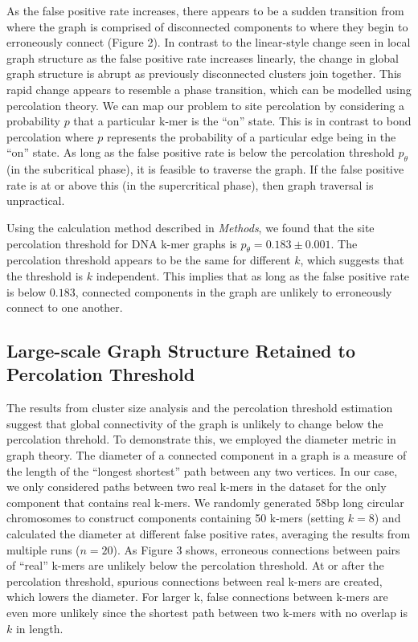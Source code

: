 \documentclass[12pt]{article} \usepackage{simplemargins}
\begin{document}
As the false positive rate increases, there appears to be a sudden
transition from where the graph is comprised of disconnected 
components to where they begin to erroneously connect (Figure 2). 
In contrast to the linear-style change seen 
in local graph structure as the false positive rate increases linearly, 
the change in global graph structure is abrupt as previously disconnected 
clusters join together.  
This rapid change appears to resemble a phase transition, which can be 
modelled using percolation theory. We can map 
our problem to site percolation by considering a probability $p$ that a 
particular k-mer is the ``on'' state. This is in contrast to bond percolation where 
$p$ represents the probability of a particular edge being in the ``on'' state. As
long as the false positive rate is below the percolation threshold $p_\theta$ (in
the subcritical phase), it is feasible to traverse the graph. If the
false positive rate is at or above this (in the supercritical phase), then graph
traversal is unpractical.

Using the calculation method described in \emph{Methods}, we found that the 
site percolation threshold for DNA k-mer graphs is $p_\theta = 0.183 \pm 0.001$. 
The percolation threshold appears to be the same for 
different $k$, which suggests that the 
threshold is $k$ independent. This implies that as long as the 
false positive rate is below $0.183$, connected components in the graph 
are unlikely to erroneously connect to one another.

\subsection{Large-scale Graph Structure Retained to Percolation Threshold}
The results from cluster size analysis and the percolation threshold 
estimation suggest that 
global connectivity of the graph is unlikely 
to change below the percolation threhold. To demonstrate this, we employed 
the diameter metric in graph theory.  
The diameter of a connected component in a graph is a measure of 
the length of the ``longest shortest'' 
path between any two vertices\cite{bondy2008graph}.
In our case, we only considered paths between two real k-mers
in the dataset for the only component that contains real k-mers. 
We randomly generated 58bp long circular
chromosomes to construct components containing 50 k-mers (setting $k=8$) and 
calculated the diameter at different false positive rates, averaging
the results from multiple runs ($n=20$).
As Figure 3 shows, 
erroneous connections between pairs of ``real'' k-mers are unlikely
below the 
percolation threshold. At or after the percolation threshold, spurious connections 
between real k-mers are created, which lowers the diameter. For larger k, false connections 
between k-mers are even more unlikely since the shortest path between two k-mers 
with no overlap is $k$ in length.
\end{document}
